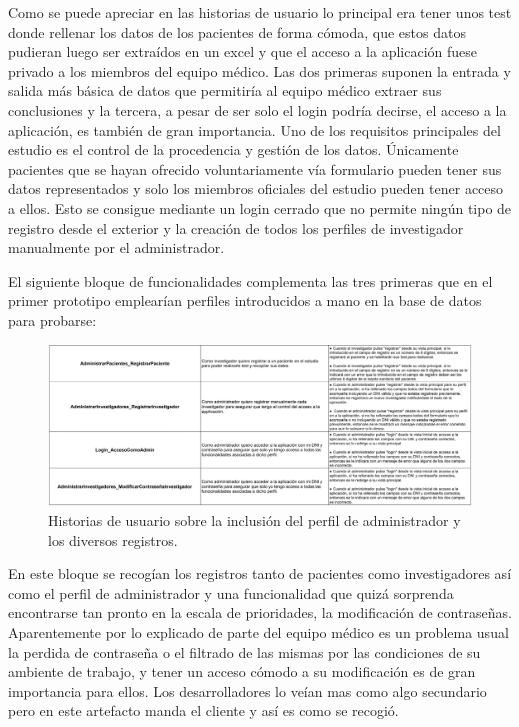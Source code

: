 Como se puede apreciar en las historias de usuario lo principal era tener unos test donde rellenar los datos de los pacientes de forma cómoda, que estos datos pudieran luego ser extraídos en un excel y que el acceso a la aplicación fuese privado a los miembros del equipo médico. Las dos primeras suponen la entrada y salida más básica de datos que permitiría al equipo médico extraer sus conclusiones y la tercera, a pesar de ser solo el login podría decirse, el acceso a la aplicación, es también de gran importancia. Uno de los requisitos principales del estudio es el control de la procedencia y gestión de los datos. Únicamente pacientes que se hayan ofrecido voluntariamente vía formulario pueden tener sus datos representados y solo los miembros oficiales del estudio pueden tener acceso a ellos. Esto se consigue mediante un login cerrado que no permite ningún tipo de registro desde el exterior y la creación de todos los perfiles de investigador manualmente por el administrador.
\newline

El siguiente bloque de funcionalidades complementa las tres primeras que en el primer prototipo emplearían perfiles introducidos a mano en la base de datos para probarse:
\newline

 \begin{figure}[h]
    \centering
     \includegraphics[width=1\textwidth]{images/historiasUsuario-2.jpg}
    \caption{Historias de usuario sobre la inclusión del perfil de administrador y los diversos registros.}
\end{figure}


En este bloque se recogían los registros tanto de pacientes como investigadores así como el perfil de administrador y una funcionalidad que quizá sorprenda encontrarse tan pronto en la escala de prioridades, la modificación de contraseñas. Aparentemente por lo explicado de parte del equipo médico es un problema usual la perdida de contraseña o el filtrado de las mismas por las condiciones de su ambiente de trabajo, y tener un acceso cómodo a su modificación es de gran importancia para ellos. Los desarrolladores lo veían mas como algo secundario pero en este artefacto manda el cliente y así es como se recogió.
\newpage

